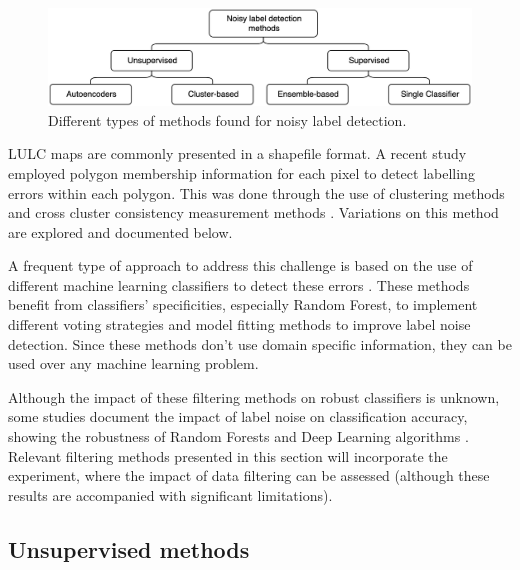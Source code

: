 \documentclass[12pt, english, openany]{book}
\begin{document}
\begin{figure}[H]
	\centering
	\includegraphics[width=1\linewidth]{noisy_label_detection.png}
  \caption{Different types of methods found for noisy label detection.}
  \label{fig:noisy-label-detection}
\end{figure}

LULC maps are commonly presented in a shapefile format. A recent study
employed polygon membership information for each pixel to detect labelling
errors within each polygon. This was done through the use of clustering methods
and cross cluster consistency measurement methods \cite{Paris2019}. Variations
on this method are explored and documented below.

A frequent type of approach to address this challenge is based on the use of
different machine learning classifiers to detect these errors
\cite{Brodley1999, Jiang2004, Liu2008, Yuan2018, Zhang2018,
Pelletier2017Filtering, Garcia-Gil2019, Boukir2019, Zhang2019}. These methods
benefit from classifiers' specificities, especially Random Forest, to implement
different voting strategies and model fitting methods to improve label noise
detection. Since these methods don't use domain specific information, they can
be used over any machine learning problem.

Although the impact of these filtering methods on robust classifiers is
unknown, some studies document the impact of label noise on classification
accuracy, showing the robustness of Random Forests and Deep Learning algorithms
\cite{Pelletier2017Effect, Rolnick2017}. Relevant filtering methods presented
in this section will incorporate the experiment, where the impact of data
filtering can be assessed (although these results are accompanied with
significant limitations).

\subsection*{Unsupervised methods}
\end{document}
